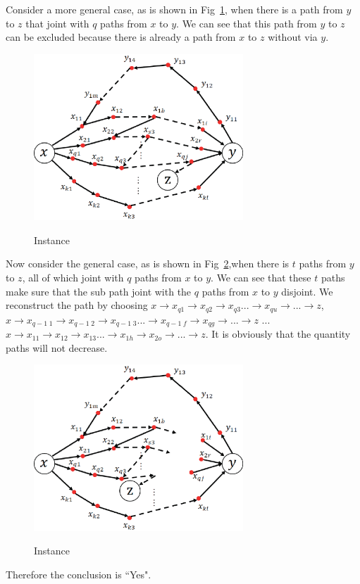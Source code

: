 Consider a more general case, as is shown in Fig~\ref{q4_2}, when there is a path from $y$ to $z$ that joint with $q$ paths from $x$ to $y$. We can see that this path from $y$ to $z$ can be excluded because there is already a path from $x$ to $z$ without via $y$.
\begin{figure}[H]
  \centering
  \includegraphics[width=0.7\textwidth]{figures/2.eps}\\
  \caption{Instance}\label{q4_2}
\end{figure}

Now consider the general case, as is shown in Fig~\ref{q4_3},when there is $t$ paths from $y$ to $z$, all of which joint with $q$ paths from $x$ to $y$. We
can see that these $t$ paths make sure that the sub path joint with the $q$ paths from $x$ to $y$ disjoint. We reconstruct the path by choosing $x\to x_{q1}\to x_{q2}\to x_{q3}...\to x_{qu}\to ... \to z$, $x\to x_{q-1\;1}\to x_{q-1\;2}\to x_{q-1\;3}...\to x_{q-1\;f}\to x_{qg} \to ... \to z$ ... $x\to x_{11}\to x_{12}\to x_{13}...\to x_{1h}\to x_{2o}\to ... \to z$. It is obviously that the quantity paths will not decrease. 
\begin{figure}[H]
  \centering
  \includegraphics[width=0.7\textwidth]{figures/3.eps}\\
  \caption{Instance}\label{q4_3}
\end{figure}
Therefore the conclusion is ``Yes".











